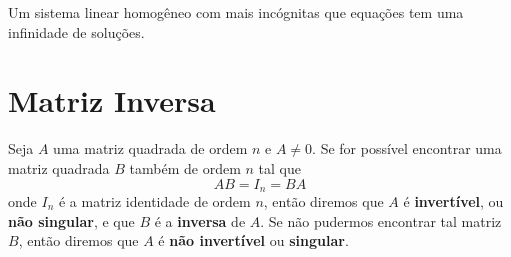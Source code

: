 \begin{teorema}
    Um sistema linear homog\^eneo com mais inc\'ognitas que equaç\~oes tem uma infinidade de soluç\~oes.
\end{teorema}

\section{Matriz Inversa}

\begin{definicao}
    Seja $A$ uma matriz quadrada de ordem $n$ e $A \ne 0$. Se for possível encontrar uma matriz quadrada $B$ também de 
    ordem $n$ tal que
    \[
        AB = I_n = BA   
    \]
    onde $I_n$ é a matriz identidade de ordem $n$, então diremos que $A$ é \textbf{invertível}, ou \textbf{não singular}, e que $B$ é a \textbf{inversa} de $A$. Se não pudermos encontrar tal matriz $B$, então diremos que $A$ é \textbf{não invertível} ou \textbf{singular}.
\end{definicao}

